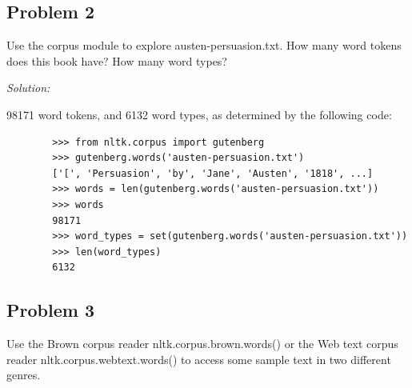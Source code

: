 \documentclass[11pt]{article}
\newenvironment{solution}{
	\vspace{10px}\noindent\emph{Solution:}
}{
	\vspace{10px}
}
\begin{document}
\subsection*{Problem 2}
Use the corpus module to explore austen-persuasion.txt. How many word tokens does this book have? How many word types?

\begin{solution}
	
	98171 word tokens, and 6132 word types, as determined by the following code:
	
	\begin{lstlisting}
		>>> from nltk.corpus import gutenberg
		>>> gutenberg.words('austen-persuasion.txt')
		['[', 'Persuasion', 'by', 'Jane', 'Austen', '1818', ...]
		>>> words = len(gutenberg.words('austen-persuasion.txt'))
		>>> words
		98171
		>>> word_types = set(gutenberg.words('austen-persuasion.txt'))
		>>> len(word_types)
		6132
	\end{lstlisting}
	
\end{solution}  


\subsection*{Problem 3}
Use the Brown corpus reader nltk.corpus.brown.words() or the Web text corpus reader nltk.corpus.webtext.words() to access some sample text in two different genres.
\end{document}

